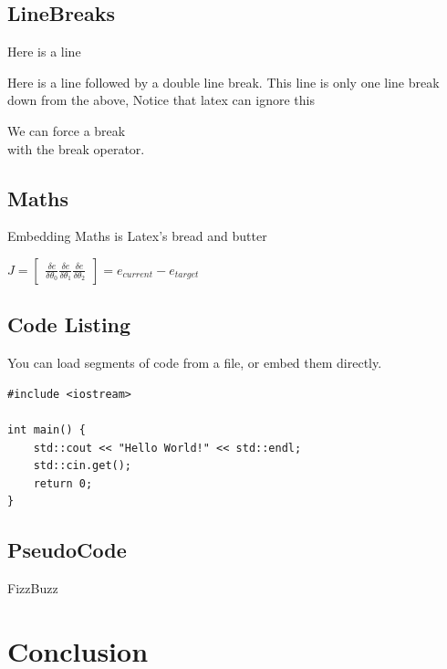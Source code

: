 \documentclass[10pt, a4paper]{article}
\begin{document}
	\subsection{LineBreaks}
	Here is a line
    
    Here is a line followed by a double line break.
	This line is only one line break down from the above, Notice that latex can ignore this
    
    We can force a break \\ with the break operator.
    
	\subsection{Maths}
    Embedding Maths is Latex's bread and butter    
    
    {\centering \Large \(
        J = \begin{bmatrix}
            \frac{\delta e}{\delta \theta _0}
            \frac{\delta e}{\delta \theta _1}
            \frac{\delta e}{\delta \theta _2}
        \end{bmatrix}
        = e_{current} - e_{target} 
    \)\par}
	
	\subsection{Code Listing}
    You can load segments of code from a file, or embed them directly.
    
\begin{lstlisting}[caption = Hello World! in c++]
#include <iostream>

int main() {
    std::cout << "Hello World!" << std::endl;
    std::cin.get();
    return 0;
}
\end{lstlisting}

%
    
\subsection{PseudoCode}

\begin{algorithm}[h]
\caption{FizzBuzz}
\end{algorithm}
	
\section{Conclusion}	


		
\end{document}
